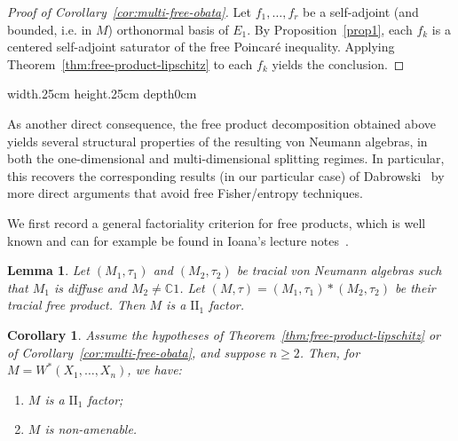 \documentclass[10pt,a4paper,reqno]{amsart}
\newtheorem{lemma}[theorem]{Lemma}
\newtheorem{corollary}[theorem]{Corollary}
\def\qed{ \hfill \vrule width.25cm height.25cm depth0cm\smallskip}
\newcommand{\C}{\mathbb{C}}
\begin{document}
\begin{proof}[Proof of Corollary~\ref{cor:multi-free-obata}]
Let $f_1,\ldots,f_r$ be a self-adjoint (and bounded, i.e. in $M$) orthonormal basis of $E_1$.  
By Proposition~\ref{prop1}, each $f_k$ is a centered self-adjoint saturator of the
free Poincaré inequality. Applying Theorem~\ref{thm:free-product-lipschitz} to each
$f_k$ yields the conclusion.
\end{proof}
\qed
\begin{flushleft}
As another direct consequence, the free product decomposition obtained above
yields several structural properties of the resulting von Neumann algebras,
in both the one-dimensional and multi-dimensional splitting regimes.  In
particular, this recovers the corresponding results (in our particular case) of
Dabrowski~\cite{Dab10} by more direct arguments that avoid free
Fisher/entropy techniques.
\end{flushleft}
\begin{flushleft}
We first record a general factoriality criterion for free products, which is well known and can for example be found in Ioana's lecture notes~\cite[Exercise~5.24]{Ioana}.    
\end{flushleft}

\begin{lemma}\label{lem:free-product-factor}
Let $(M_1,\tau_1)$ and $(M_2,\tau_2)$ be tracial von Neumann algebras such that
$M_1$ is diffuse and $M_2\neq\C 1$. Let $(M,\tau)=(M_1,\tau_1)*(M_2,\tau_2)$ be
their tracial free product. Then $M$ is a $\mathrm{II}_1$ factor.
\end{lemma}

\begin{corollary}\label{cor:nonamenable-nonGamma}
Assume the hypotheses of Theorem~\ref{thm:free-product-lipschitz} or of
Corollary~\ref{cor:multi-free-obata}, and suppose $n\ge 2$. Then, for
$M=W^\ast(X_1,\ldots,X_n)$, we have:
\begin{enumerate}
  \item $M$ is a $\mathrm{II}_1$ factor;
  \item $M$ is non-amenable.
\end{enumerate}
\end{corollary}
\end{document}
